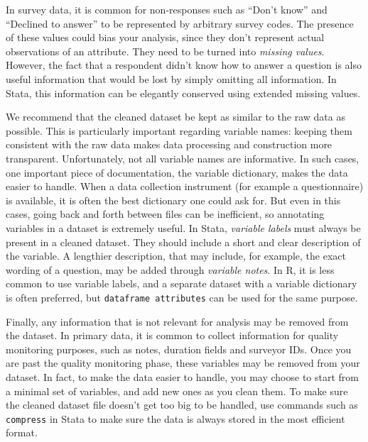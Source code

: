 In survey data, it is common for non-responses such as ``Don't know'' and ``Declined to answer''
to be represented by arbitrary survey codes. 
The presence of these values could bias your analysis,
since they don't represent actual observations of an attribute.
They need to be turned into \textit{missing values}.
However, the fact that a respondent didn't know how to answer a question is also useful information
that would be lost by simply omitting all information.
In Stata, this information can be elegantly conserved using extended missing values.

We recommend that the cleaned dataset be kept as similar to the raw data as possible.
This is particularly important regarding variable names:
keeping them consistent with the raw data makes data processing and construction more transparent.
Unfortunately, not all variable names are informative.
In such cases, one important piece of documentation,
the variable dictionary, makes the data easier to handle.
When a data collection instrument (for example a questionnaire) is available, 
it is often the best dictionary one could ask for.
But even in this cases, going back and forth between files can be inefficient,
so annotating variables in a dataset is extremely useful.
In Stata, \textit{variable labels} must always be present in a cleaned dataset.
They should include a short and clear description of the variable.
A lengthier description, that may include, for example,
the exact wording of a question, may be added through \textit{variable notes}.
In R, it is less common to use variable labels,
and a separate dataset with a variable dictionary is often preferred,
but \texttt{dataframe attributes} can be used for the same purpose.

Finally, any information that is not relevant for analysis may be removed from the dataset.
In primary data, it is common to collect information for quality monitoring purposes,
such as notes, duration fields and surveyor IDs.
Once you are past the quality monitoring phase,
these variables may be removed from your dataset.
In fact, to make the data easier to handle,
you may choose to start from a minimal set of variables,
and add new ones as you clean them.
To make sure the cleaned dataset file doesn't get too big to be handled,
use commands such as \texttt{compress} in Stata to make sure the data
is always stored in the most efficient format.

